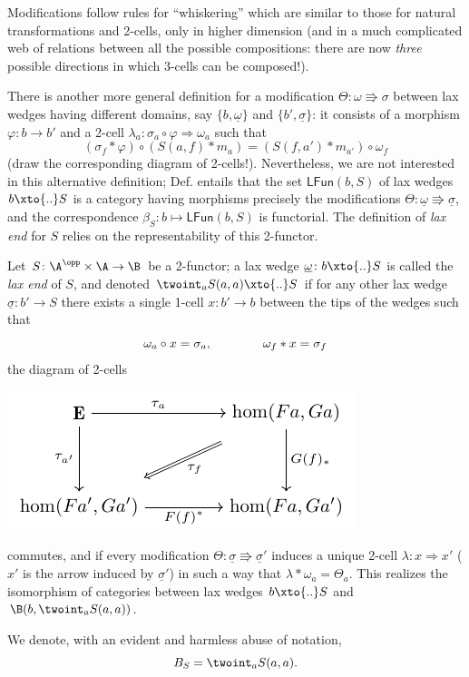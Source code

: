Modifications follow rules for ``whiskering'' which are similar to those for natural transformations and 2-cells, only in higher dimension (and in a much complicated web of relations between all the possible compositions: there are now \emph{three} possible directions in which 3-cells can be composed!).
\begin{remark}
There is another more general definition for a modification $\Theta\colon \omega\Rrightarrow\sigma$ between lax wedges having different domains, say $\{b, \underline{\omega}\}$ and $\{b', \underline\sigma\}$: it consists of a morphism $\varphi\colon b\to b'$ and a 2-cell $\lambda_a\colon \sigma_a \circ\varphi \Rightarrow \omega_a$ such that
\[
(\sigma_f * \varphi)\circ (S(a,f) * m_a) = (S(f, a') * m_{a'})\circ \omega_f
\]
(draw the corresponding diagram of 2-cells!). Nevertheless, we are not interested in this alternative definition; Def\@.  entails that the set $\textsf{LFun}(b, S)$ of lax wedges $b\xto{..}S$ is a category having morphisms precisely the modifications $\Theta\colon \underline\omega\Rrightarrow \underline\sigma$, and the correspondence $\beta_S\colon b\mapsto \textsf{LFun}(b,S)$ is functorial. The definition of \emph{lax end} for $S$ relies on the representability of this 2-functor.
\end{remark}
\begin{definition}
Let $S\colon \A^\opp\times \A \to \B$ be a 2-functor; a lax wedge $\underline\omega\colon b\xto{..} S$ is called the \emph{lax end} of $S$, and denoted $\twoint_a S(a,a) \xto{..} S$ if for any other lax wedge $\underline\sigma\colon b'\to S$ there exists a single 1-cell $x\colon b'\to b$ between the tips of the wedges such that
\[
\omega_a \circ x = \sigma_a, \notag\qquad\qquad
\omega_f * x = \sigma_f
\]
\ie the diagram of 2-cells
\begin{center}
\includegraphics[scale=1]{figures/fig19}
\end{center}
commutes, and if every modification $\Theta\colon \underline\sigma\Rrightarrow \underline\sigma'$ induces a unique 2-cell $\lambda\colon x\Rightarrow x'$ ($x'$ is the arrow induced by $\underline\sigma'$) in such a way that
$\lambda * \omega_a = \Theta_a$. This realizes the isomorphism of categories between lax wedges $b \xto{..} S$ and $\B(b, \twoint_a S(a,a))$.

We denote, with an evident and harmless abuse of notation, \[
B_S = \twoint_a S(a,a).
\]
\end{definition}
